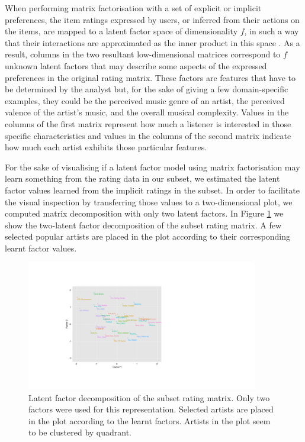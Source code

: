 When performing matrix factorisation with a set of explicit or implicit preferences, the item ratings expressed by users, or inferred from their actions on the items, are mapped to a latent factor space of dimensionality $f$, in such a way that their interactions are approximated as the inner product in this space \autocite{koren09matrix}.
As a result, columns in the two resultant low-dimensional matrices correspond to $f$ unknown latent factors that may describe some aspects of the expressed preferences in the original rating matrix. 
These factors are features that have to be determined by the analyst but, for the sake of giving a few domain-specific examples, they could be the perceived music genre of an artist, the perceived valence of the artist's music, and the overall musical complexity.
Values in the columns of the first matrix represent how much a listener is interested in those specific characteristics and values in the columns of the second matrix indicate how much each artist exhibits those particular features.

For the sake of visualising if a latent factor model using matrix factorisation may learn something from the rating data in our subset, we estimated the latent factor values learned from the implicit ratings in the subset. In order to facilitate the visual inspection by transferring those values to a two-dimensional plot, we computed matrix decomposition with only two latent factors. 
In Figure \ref{fig:latent_factors} we show the two-latent factor decomposition of the subset rating matrix. A few selected popular artists are placed in the plot according to their corresponding learnt factor values. 

\graphicspath{{./figs/ch7/}}
  \begin{figure}[!h]
  \centering
  \includegraphics[width=0.9\textwidth]{latent_factors_1.pdf}
  \caption[Latent factor decomposition of the subset rating matrix]{Latent factor decomposition of the subset rating matrix. Only two factors were used for this representation. Selected artists are placed in the plot according to the learnt factors. Artists in the plot seem to be clustered by quadrant.}
  \label{fig:latent_factors}
  \end{figure}



